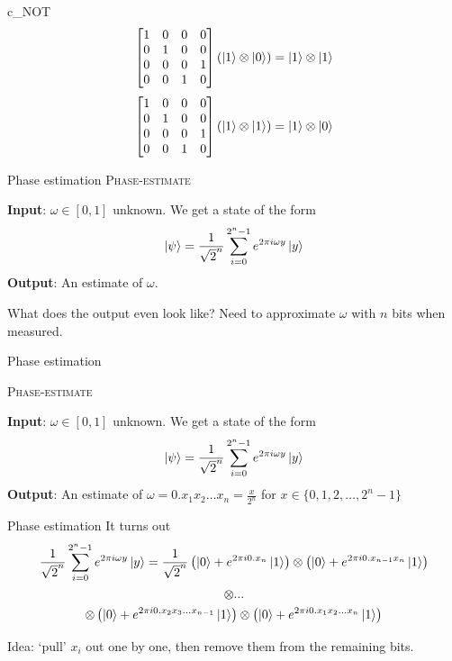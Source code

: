 \documentclass{beamer}
\begin{document}
\begin{frame}{c_NOT}
$$\begin{bmatrix}
   1 & 0 & 0 & 0\\
   0 & 1 & 0 & 0\\
   0 & 0 & 0 & 1\\
   0 & 0 & 1 & 0
   \end{bmatrix}(\ket{1} \otimes \ket{0}) = \ket{1} \otimes \ket{1}$$
   $$\begin{bmatrix}
   1 & 0 & 0 & 0\\
   0 & 1 & 0 & 0\\
   0 & 0 & 0 & 1\\
   0 & 0 & 1 & 0
   \end{bmatrix}(\ket{1} \otimes \ket{1}) = \ket{1} \otimes \ket{0}$$
\end{frame}
\begin{frame}{Phase estimation}
    \textsc{Phase-estimate}
    
    \textbf{Input}: $\omega \in [0, 1]$ unknown. We get a state of the form $$
    \ket{\psi} = \frac{1}{\sqrt{2}^n} \sum_{i = 0}^{2^n - 1} e^{2 \pi i \omega y} \ket{y}$$
    \textbf{Output}: An estimate of $\omega$. \pause
    
    What does the output even look like? Need to approximate $\omega$ with $n$ bits when measured.
\end{frame} 
\begin{frame}{Phase estimation}

 \textsc{Phase-estimate}
 
    \textbf{Input}: $\omega \in [0, 1]$ unknown. We get a state of the form $$
    \ket{\psi} = \frac{1}{\sqrt{2}^n} \sum_{i = 0}^{2^n - 1} e^{2 \pi i \omega y} \ket{y}$$
    \textbf{Output}: An estimate of $\omega = 0.x_1 x_2 \ldots x_n = \frac{x}{2^n}$ for $x \in \{ 0, 1, 2, \ldots, 2^{n}-1\}$

\end{frame} 
\begin{frame}{Phase estimation}
    It turns out
    $$\frac{1}{\sqrt{2}^n} \sum_{i = 0}^{2^n - 1} e^{2 \pi i \omega y} \ket{y} = \frac{1}{\sqrt{2}^n} \left(\ket{0} + e^{2 \pi i 0.x_n} \ket{1} \right) \otimes \left(\ket{0} + e^{2 \pi i 0.x_{n-1} x_n} \ket{1} \right)$$
    $$\otimes \ldots  $$ 
    $$\otimes  \left(\ket{0} + e^{2 \pi i 0.x_{2} x_3 \ldots x_{n-1}} \ket{1} \right) \otimes \left(\ket{0} + e^{2 \pi i 0.x_{1} x_2 \ldots x_{n}} \ket{1} \right)$$ \pause
    
    Idea: `pull' $x_i$ out one by one, then remove them from the remaining bits.
\end{frame}
\end{document}
